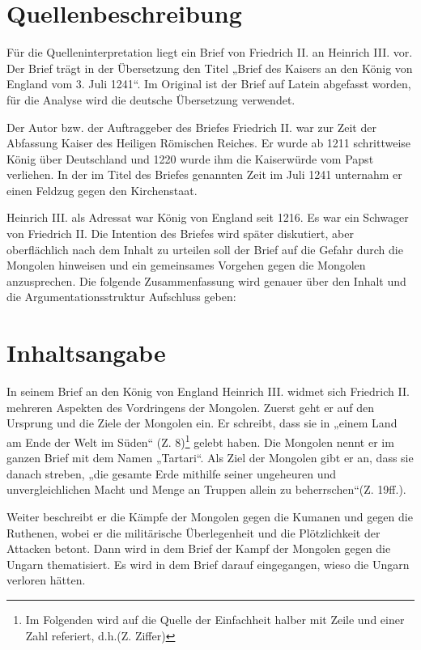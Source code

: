\documentclass{../../sem_paper}
\begin{document}
\section{Quellenbeschreibung}
Für die Quelleninterpretation liegt ein Brief von Friedrich II. an Heinrich III. vor.
Der Brief trägt in der Übersetzung den Titel „Brief des Kaisers an den König von
England vom 3. Juli 1241“. Im Original ist der Brief auf Latein abgefasst worden, für
die Analyse wird die deutsche Übersetzung verwendet.

Der Autor bzw. der Auftraggeber des Briefes Friedrich II. war zur Zeit der Abfassung
Kaiser des Heiligen Römischen Reiches. Er wurde ab 1211 schrittweise König über
Deutschland und 1220 wurde ihm die Kaiserwürde vom Papst verliehen. In der im Titel
des Briefes genannten Zeit im Juli 1241 unternahm er einen Feldzug gegen den
Kirchenstaat.

Heinrich III. als Adressat war König von England seit 1216. Es war ein Schwager
von Friedrich II. Die Intention des Briefes wird später diskutiert, aber
oberflächlich nach dem Inhalt zu urteilen soll der Brief auf die Gefahr durch die
Mongolen hinweisen und ein gemeinsames Vorgehen gegen die Mongolen
anzusprechen. Die folgende Zusammenfassung wird genauer über den Inhalt und die
Argumentationsstruktur Aufschluss geben:

\section{Inhaltsangabe}
In seinem Brief an den König von England Heinrich III. widmet sich Friedrich II.
mehreren Aspekten des Vordringens der Mongolen. Zuerst geht er auf den Ursprung und
die Ziele der Mongolen ein. Er schreibt, dass sie in „einem Land am Ende der Welt im
Süden“ (Z. 8)\footnote{Im Folgenden wird auf die Quelle der Einfachheit halber mit Zeile und einer Zahl referiert, d.h.(Z.
Ziffer)} gelebt haben. Die Mongolen nennt er im ganzen Brief mit dem Namen
„Tartari“. Als Ziel der Mongolen gibt er an, dass sie danach streben, „die gesamte Erde mithilfe
seiner ungeheuren und unvergleichlichen Macht und Menge an Truppen allein zu
beherrschen“(Z. 19ff.).

Weiter beschreibt er die Kämpfe der Mongolen gegen die Kumanen und gegen die
Ruthenen, wobei er die militärische Überlegenheit und die Plötzlichkeit der Attacken
betont. Dann wird in dem Brief der Kampf der Mongolen gegen die Ungarn
thematisiert. Es wird in dem Brief darauf eingegangen, wieso die Ungarn verloren
hätten.
\end{document}
